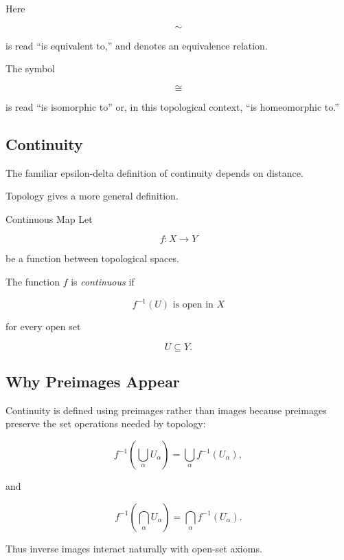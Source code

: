 Here

\[
\sim
\]

is read ``is equivalent to,'' and denotes an equivalence relation.

The symbol

\[
\cong
\]

is read ``is isomorphic to'' or, in this topological context,
``is homeomorphic to.''

\subsection{Continuity}
\label{subsec:topological-continuity}

The familiar epsilon-delta definition of continuity depends on distance.

Topology gives a more general definition.

\begin{definitionbox}{Continuous Map}
Let

\[
f:X\to Y
\]

be a function between topological spaces.

The function \(f\) is \emph{continuous} if

\[
\boxed{
f^{-1}(U)
\text{ is open in }X
}
\]

for every open set

\[
U\subseteq Y.
\]
\end{definitionbox}

\subsection{Why Preimages Appear}
\label{subsec:continuity-preimages}

Continuity is defined using preimages rather than images because preimages
preserve the set operations needed by topology:

\[
f^{-1}
\left(
\bigcup_\alpha U_\alpha
\right)
=
\bigcup_\alpha f^{-1}(U_\alpha),
\]

and

\[
f^{-1}
\left(
\bigcap_\alpha U_\alpha
\right)
=
\bigcap_\alpha f^{-1}(U_\alpha).
\]

Thus inverse images interact naturally with open-set axioms.


